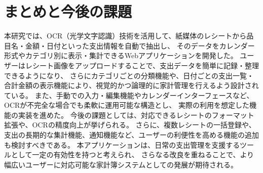 \documentclass[main]{subfiles}
\begin{document}
\chapter{まとめと今後の課題}
\label{cha:conclusion}
本研究では、OCR（光学文字認識）技術を活用して、紙媒体のレシートから品目名・金額・日付といった支出情報を自動で抽出し、  
そのデータをカレンダー形式やカテゴリ別に表示・集計できるWebアプリケーションを開発した。
ユーザーはレシート画像をアップロードすることで、支出データを簡単に記録・整理できるようになり、  
さらにカテゴリごとの分類機能や、日付ごとの支出一覧・合計金額の表示機能により、視覚的かつ論理的に家計管理を行えるよう設計されている。
また、手動での入力・編集機能やカレンダーインターフェースなど、OCRが不完全な場合でも柔軟に運用可能な構造とし、  
実際の利用を想定した機能の実装を進めた。
今後の課題としては、対応できるレシートのフォーマット拡張や、OCRの精度向上が挙げられる。  
さらに、複数レシートの一括登録や、支出の長期的な集計機能、通知機能など、ユーザーの利便性を高める機能の追加も検討すべきである。
本アプリケーションは、日常の支出管理を支援するツールとして一定の有効性を持つと考えられ、  
さらなる改良を重ねることで、より幅広いユーザーに対応可能な家計簿システムとしての発展が期待される。
\end{document}
